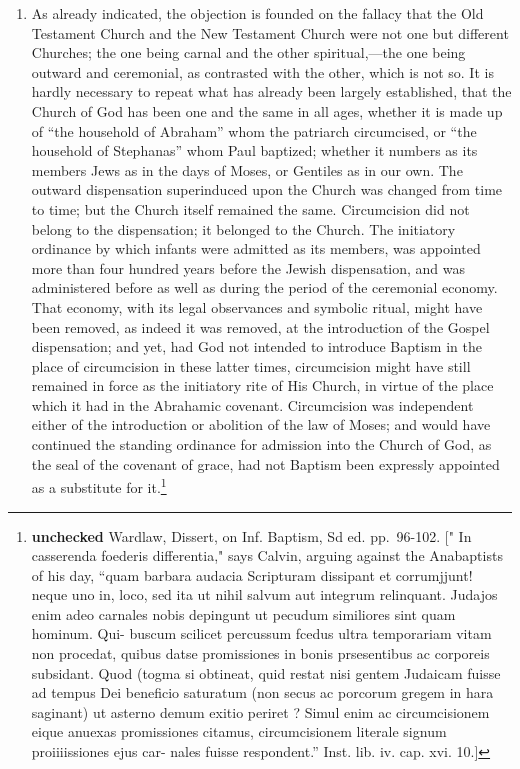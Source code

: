 \documentclass[]{book}
\providecommand{\tightlist}{%
  \setlength{\itemsep}{0pt}\setlength{\parskip}{0pt}}
\begin{document}
\begin{enumerate}
\def\labelenumi{\arabic{enumi}.}
\tightlist
\item
  As already indicated, the objection is founded on the fallacy that the Old Testament Church and the New Testament Church were not one but different Churches; the one being carnal and the other spiritual,---the one being outward and ceremonial, as contrasted with the other, which is not so. It is hardly necessary to repeat what has already been largely established, that the Church of God has been one and the same in all ages, whether it is made up of ``the household of Abraham'' whom the patriarch circumcised, or ``the household of Stephanas'' whom Paul baptized; whether it numbers as its members Jews as in the days of Moses, or Gentiles as in our own. The outward dispensation superinduced upon the Church was changed from time to time; but the Church itself remained the same. Circumcision did not belong to the dispensation; it belonged to the Church. The initiatory ordinance by which infants were admitted as its members, was appointed more than four hundred years before the Jewish dispensation, and was administered before as well as during the period of the ceremonial economy. That economy, with its legal observances and symbolic ritual, might have been removed, as indeed it was removed, at the introduction of the Gospel dispensation; and yet, had God not intended to introduce Baptism in the place of circumcision in these latter times, circumcision might have still remained in force as the initiatory rite of His Church, in virtue of the place which it had in the Abrahamic covenant. Circumcision was independent either of the introduction or abolition of the law of Moses; and would have continued the standing ordinance for admission into the Church of God, as the seal of the covenant of grace, had not Baptism been expressly appointed as a substitute for it.\footnote{\textbf{unchecked} Wardlaw, Dissert, on Inf. Baptism, Sd ed. pp.~96-102. {[}" In casserenda foederis differentia," says Calvin, arguing against the Anabaptists of his day, ``quam barbara audacia Scripturam dissipant et corrumjjunt! neque uno in, loco, sed ita ut nihil salvum aut integrum relinquant. Judajos enim adeo carnales nobis depingunt ut pecudum similiores sint quam hominum. Qui- buscum scilicet percussum fcedus ultra temporariam vitam non procedat, quibus datse promissiones in bonis prsesentibus ac corporeis subsidant. Quod (togma si obtineat, quid restat nisi gentem Judaicam fuisse ad tempus Dei beneficio saturatum (non secus ac porcorum gregem in hara saginant) ut asterno demum exitio periret ? Simul enim ac circumcisionem eique anuexas promissiones citamus, circumcisionem literale signum proiiiissiones ejus car- nales fuisse respondent.'' Inst. lib. iv. cap. xvi. 10.{]}}
\end{enumerate}
\end{document}
